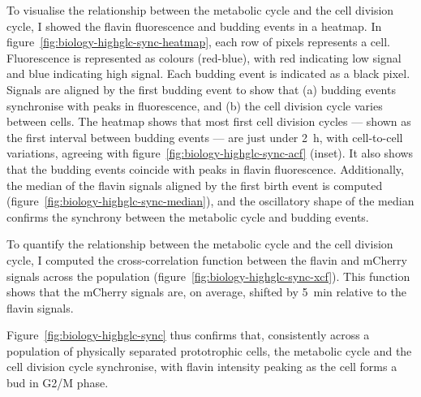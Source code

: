 To visualise the relationship between the metabolic cycle and the cell division cycle, I showed the flavin fluorescence and budding events in a heatmap.
In figure~\ref{fig:biology-highglc-sync-heatmap},
each row of pixels represents a cell.
Fluorescence is represented as colours (red-blue), with red indicating low signal and blue indicating high signal.
Each budding event is indicated as a black pixel.
Signals are aligned by the first budding event to show that
(a) budding events synchronise with peaks in fluorescence, and
(b) the cell division cycle varies between cells.
The heatmap shows that most first cell division cycles --- shown as the first interval between budding events --- are just under \SI{2}{\hour}, with cell-to-cell variations, agreeing with figure~\ref{fig:biology-highglc-sync-acf} (inset).
It also shows that the budding events coincide with peaks in flavin fluorescence.
Additionally, the median of the flavin signals aligned by the first birth event is computed (figure~\ref{fig:biology-highglc-sync-median}), and the oscillatory shape of the median confirms the synchrony between the metabolic cycle and budding events.

To quantify the relationship between the metabolic cycle and the cell division cycle, I computed the cross-correlation function between the flavin and mCherry signals across the population (figure~\ref{fig:biology-highglc-sync-xcf}).
This function shows that the mCherry signals are, on average, shifted by \SI{5}{\minute} relative to the flavin signals.

Figure~\ref{fig:biology-highglc-sync} thus confirms that, consistently across a population of physically separated prototrophic cells, the metabolic cycle and the cell division cycle synchronise, with flavin intensity peaking as the cell forms a bud in G2/M phase.


